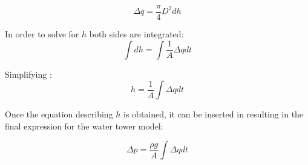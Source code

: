 \begin{equation}
  \Delta q =  \frac{\pi}{4} D^2 {dh}
\end{equation}

In order to solve for $h$ both sides are integrated: 
\begin{equation}
  \int dh = \int \frac{1}{A} \Delta q dt
  \label{integheight}
\end{equation}

Simplifying :
\begin{equation}
  h =\frac{1}{A}  \int  \Delta q dt
\end{equation}

Once the equation describing $h$ is obtained, it can be inserted in  
resulting in the final expression for the water tower model:


\begin{equation}
  \Delta p =  \frac{\rho g}{A}  \int  \Delta q dt
\end{equation}



